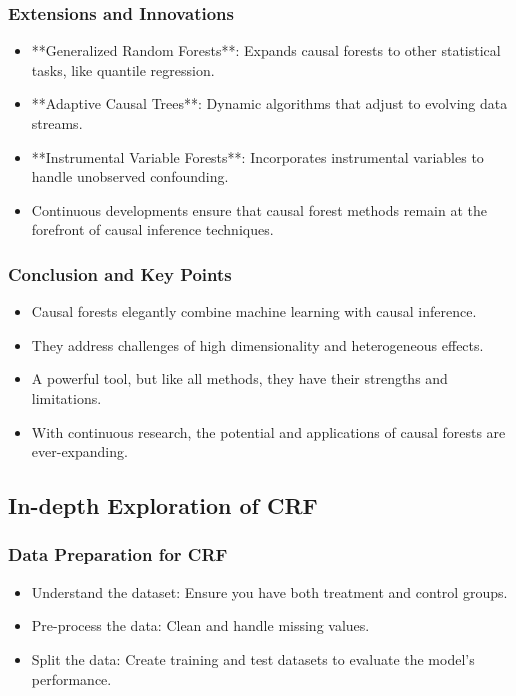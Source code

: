 \documentclass{beamer}
\begin{document}
\begin{frame}
\frametitle{Extensions and Innovations}
\begin{itemize}
    \item **Generalized Random Forests**: Expands causal forests to other statistical tasks, like quantile regression.
    \item **Adaptive Causal Trees**: Dynamic algorithms that adjust to evolving data streams.
    \item **Instrumental Variable Forests**: Incorporates instrumental variables to handle unobserved confounding.
    \item Continuous developments ensure that causal forest methods remain at the forefront of causal inference techniques.
\end{itemize}
\end{frame}


\begin{frame}
\frametitle{Conclusion and Key Points}
\begin{itemize}
    \item Causal forests elegantly combine machine learning with causal inference.
    \item They address challenges of high dimensionality and heterogeneous effects.
    \item A powerful tool, but like all methods, they have their strengths and limitations.
    \item With continuous research, the potential and applications of causal forests are ever-expanding.
\end{itemize}
\end{frame}




\subsection{In-depth Exploration of CRF}

\begin{frame}
\frametitle{Data Preparation for CRF}
\begin{itemize}
    \item Understand the dataset: Ensure you have both treatment and control groups.
    \item Pre-process the data: Clean and handle missing values.
    \item Split the data: Create training and test datasets to evaluate the model's performance.
\end{itemize}
\end{frame}
\end{document}
